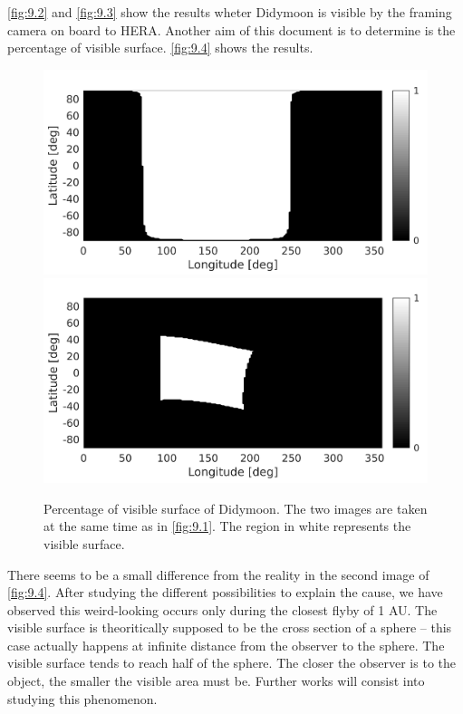 \autoref{fig:9.2} and \autoref{fig:9.3} show the results wheter Didymoon is visible by the framing camera on board to HERA. Another aim of this document is to determine is the percentage of visible surface. \autoref{fig:9.4} shows the results.

\begin{figure}[t]
    \includegraphics[width=0.49\linewidth]{rsc/areacov1.png}
    \includegraphics[width=0.49\linewidth]{rsc/areacov2.png}
    \caption{Percentage of visible surface of Didymoon. The two images are taken at the same time as in \autoref{fig:9.1}. The region in white represents the visible surface.}
    \label{fig:9.4}
\end{figure}

There seems to be a small difference from the reality in the second image of \autoref{fig:9.4}. After studying the different possibilities to explain the cause, we have observed this weird-looking occurs only during the closest flyby of 1 \si{AU}. The visible surface is theoritically supposed to be the cross section of a sphere -- this case actually happens at infinite distance from the observer to the sphere. The visible surface tends to reach half of the sphere. The closer the observer is to the object, the smaller the visible area must be. Further works will consist into studying this phenomenon.
